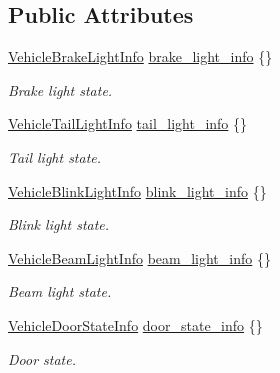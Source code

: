 \subsection*{Public Attributes}
\begin{DoxyCompactItemize}
\item 
\hyperlink{structmaf__perception__interface_1_1VehicleBrakeLightInfo}{Vehicle\+Brake\+Light\+Info} \hyperlink{structmaf__perception__interface_1_1VehicleStateInfo_a556724544ba2699f89a68d0240bde961}{brake\+\_\+light\+\_\+info} \{\}
\begin{DoxyCompactList}\small\item\em Brake light state. \end{DoxyCompactList}\item 
\hyperlink{structmaf__perception__interface_1_1VehicleTailLightInfo}{Vehicle\+Tail\+Light\+Info} \hyperlink{structmaf__perception__interface_1_1VehicleStateInfo_a6de7d9122b57bbf5a95523fac0d82b1e}{tail\+\_\+light\+\_\+info} \{\}
\begin{DoxyCompactList}\small\item\em Tail light state. \end{DoxyCompactList}\item 
\hyperlink{structmaf__perception__interface_1_1VehicleBlinkLightInfo}{Vehicle\+Blink\+Light\+Info} \hyperlink{structmaf__perception__interface_1_1VehicleStateInfo_aa0378cddf58d9b47233b991dada29d28}{blink\+\_\+light\+\_\+info} \{\}
\begin{DoxyCompactList}\small\item\em Blink light state. \end{DoxyCompactList}\item 
\hyperlink{structmaf__perception__interface_1_1VehicleBeamLightInfo}{Vehicle\+Beam\+Light\+Info} \hyperlink{structmaf__perception__interface_1_1VehicleStateInfo_a4f934009e30b51a0e345629e5dbebba8}{beam\+\_\+light\+\_\+info} \{\}
\begin{DoxyCompactList}\small\item\em Beam light state. \end{DoxyCompactList}\item 
\hyperlink{structmaf__perception__interface_1_1VehicleDoorStateInfo}{Vehicle\+Door\+State\+Info} \hyperlink{structmaf__perception__interface_1_1VehicleStateInfo_ac90d57a17f39c5b0ea88269168481d40}{door\+\_\+state\+\_\+info} \{\}
\begin{DoxyCompactList}\small\item\em Door state. \end{DoxyCompactList}\item 

\end{DoxyCompactItemize}
